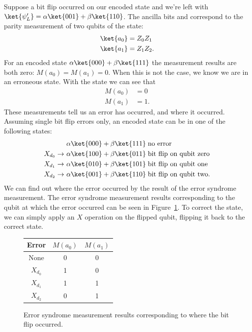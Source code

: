 \documentclass[11pt, notitlepage]{report}
\begin{document}
\noindent
Suppose a bit flip occurred on our encoded state  and we're left with $\ket{\psi_L'} = \alpha\ket{001} + \beta\ket{110}$. The ancilla bits  and  correspond to the parity measurement of two qubits of the state:
\begin{align}
  \ket{a_0} &= Z_0Z_1 \\
  \ket{a_1} &= Z_1Z_2.
\end{align}
For an encoded state $\alpha\ket{000} + \beta\ket{111}$ the measurement results are both zero: $M(a_0) = M(a_1) = 0$. When this is not the case, we know we are in an erroneous state. With the state  we can see that
\begin{align}
  M(a_0) &= 0 \\
  M(a_1) &= 1.
\end{align}
These measurements tell us an error has occurred, and where it occurred. Assuming single bit flip errors only, an encoded state can be in one of the following states:
\begin{align}
  &\alpha\ket{000} + \beta\ket{111} \; \text{no error} \\
  X_{d_0} \rightarrow \  &\alpha\ket{100} + \beta\ket{011} \; \text{bit flip on qubit zero} \\
  X_{d_1} \rightarrow \  &\alpha\ket{010} + \beta\ket{101} \; \text{bit flip on qubit one} \\
  X_{d_2} \rightarrow \  &\alpha\ket{001} + \beta\ket{110} \; \text{bit flip on qubit two}.
\end{align}
We can find out where the error occurred by the result of the error syndrome measurement. The error syndrome measurement results corresponding to the qubit at which the error occurred can be seen in Figure~\ref{fig:zz_stabilizer_measurement_results}. To correct the state, we can simply apply an $X$ operation on the flipped qubit, flipping it back to the correct state.
\begin{figure}[ht]
  \centering
  \begin{tabular}{c|c|c}
    Error & $M(a_0)$ & $M(a_1)$ \\ \hline
    None & 0 & 0 \\
    $X_{d_0}$ & 1 & 0 \\
    $X_{d_1}$ & 1 & 1 \\
    $X_{d_2}$ & 0 & 1
  \end{tabular}
  \caption{Error syndrome measurement results corresponding to where the bit flip occurred.}
  \label{fig:zz_stabilizer_measurement_results}
\end{figure}
\end{document}
